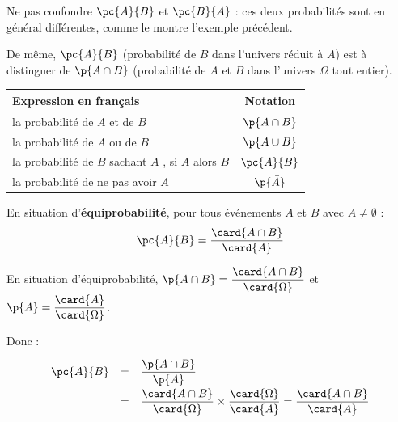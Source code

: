\begin{piege}
	Ne pas confondre $\pc{A}{B}$ et $\pc{B}{A}$ : ces deux probabilités sont en général différentes, comme le montre l'exemple précédent.

	De même, $\pc{A}{B}$ (probabilité de $B$ dans l'univers réduit à $A$) est à distinguer de $\p{A \cap B}$ (probabilité de $A$ et $B$ dans l'univers $\Omega$ tout entier).
\end{piege}

\begin{remarque}
	\nline
	\begin{center}
		\begin{tabular}{|l|c|} \hline
			\textbf{Expression en français}                                         & \textbf{Notation} \\ \hline
			\og la probabilité de $A$ et de $B$ \fg{}                               & $\p{A \cap B}$    \\ \hline
			\og la probabilité de $A$ ou de $B$ \fg{}                               & $\p{A \cup B}$    \\ \hline
			\og la probabilité de $B$ sachant $A$ \fg{}, \og si $A$ alors $B$ \fg{} & $\pc{A}{B}$       \\ \hline
			\og la probabilité de ne pas avoir $A$ \fg{}                            & $\p{\bar{A}}$     \\ \hline
		\end{tabular}
	\end{center}
\end{remarque}

\begin{prop}
	En situation d'\textbf{équiprobabilité}, pour tous événements $A$ et $B$ avec $A \neq \emptyset$ :
	\[
		\pc{A}{B} = \dfrac{\card{A \cap B}}{\card{A}}
	\]
\end{prop}

\begin{demo}
	En situation d'équiprobabilité, $\p{A \cap B} = \dfrac{\card{A \cap B}}{\card{\Omega}}$ et $\p{A} = \dfrac{\card{A}}{\card{\Omega}}$.

	Donc :
	\[
		\def\arraystretch{2}
		\begin{array}{rcl}
			\pc{A}{B} & = & \dfrac{\p{A \cap B}}{\p{A}}                                                                                       \\
			          & = & \dfrac{\card{A \cap B}}{\card{\Omega}} \times \dfrac{\card{\Omega}}{\card{A}} = \dfrac{\card{A \cap B}}{\card{A}}
		\end{array}
	\]
\end{demo}

